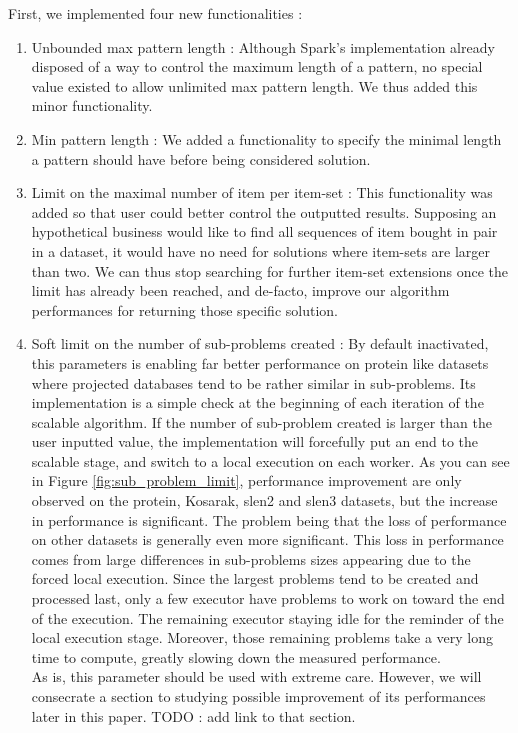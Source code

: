 \documentclass{eplmastersthesis}
\begin{document}
First, we implemented four new functionalities :
\begin{enumerate}
	\item Unbounded max pattern length : Although Spark's implementation already disposed of a way to control the maximum length of a pattern, no special value existed to allow unlimited max pattern length. We thus added this minor functionality.
	\item Min pattern length : We added a functionality to specify the minimal length a pattern should have before being considered solution.
	\item Limit on the maximal number of item per item-set : This functionality was added so that user could better control the outputted results. Supposing an hypothetical business would like to find all sequences of item bought in pair in a dataset, it would have no need for solutions where item-sets are larger than two. We can thus stop searching for further item-set extensions once the limit has already been reached, and de-facto, improve our algorithm performances for returning those specific solution.
	\item Soft limit on the number of sub-problems created : By default inactivated, this parameters is enabling far better performance on protein like datasets where projected databases tend to be rather similar in sub-problems. Its implementation is a simple check at the beginning of each iteration of the scalable algorithm. If the number of sub-problem created is larger than the user inputted value, the implementation will forcefully put an end to the scalable stage, and switch to a local execution on each worker.\newline
	 As you can see in Figure \ref{fig:sub_problem_limit}, performance improvement are only observed on the protein, Kosarak, slen2 and slen3 datasets, but the increase in performance is significant. The problem being that the loss of performance on other datasets is generally even more significant. This loss in performance comes from large differences in sub-problems sizes appearing due to the forced local execution. Since the largest problems tend to be created and processed last, only a few executor have problems to work on toward the end of the execution. The remaining executor staying idle for the reminder of the local execution stage. Moreover, those remaining problems take a very long time to compute, greatly slowing down the measured performance. \\
	 As is, this parameter should be used with extreme care. However, we will consecrate a section to studying possible improvement of its performances later in this paper. TODO : add link to that section.
\end{enumerate}
\end{document}
